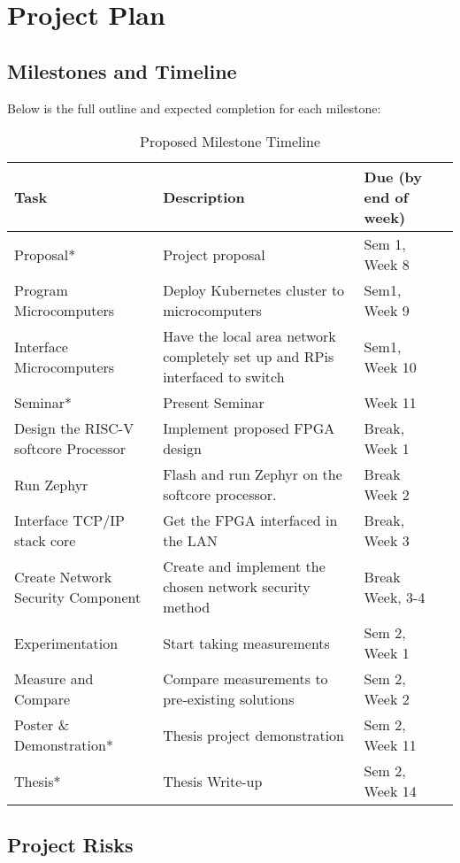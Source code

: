 \chapter[Project Outline]{Project Plan}
\label{Chap:Project Outline}

\section{Milestones and Timeline}
Below is the full outline and expected completion for each milestone:
\begin{table}[hbt!]
    \centering%
        \caption{Proposed Milestone Timeline}\label{table:Milestones}
        \begin{tabularx}{\textwidth}{ lXll }
            \hline
            Task & Description & Due (by end of week) \\ 
            \hline
            Proposal* & Project proposal & Sem 1, Week 8 \\
            Program Microcomputers & Deploy Kubernetes cluster to microcomputers & Sem1, Week 9 \\
            Interface Microcomputers & Have the local area network completely set up and RPis interfaced to switch & Sem1, Week 10 \\
            Seminar* & Present Seminar & Week 11 \\
            Design the RISC-V softcore Processor & Implement proposed FPGA design & Break, Week 1 \\
            Run Zephyr & Flash and run Zephyr on the softcore processor. & Break Week 2 \\
            Interface TCP/IP stack core & Get the FPGA interfaced in the LAN  & Break, Week 3 \\ 
            Create Network Security Component & Create and implement the chosen network security method & Break Week, 3-4 \\ 
            Experimentation & Start taking measurements & Sem 2, Week 1 \\ 
            Measure and Compare &  Compare measurements to pre-existing solutions & Sem 2, Week 2 \\ 
            Poster \& Demonstration* & Thesis project demonstration & Sem 2, Week 11 \\
            Thesis* & Thesis Write-up & Sem 2, Week 14 \\
            \hline
            \end{tabularx}
    \end{table}

\clearpage
\section{Project Risks}
